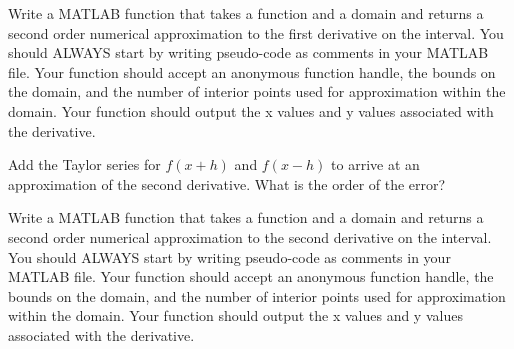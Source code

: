 
\begin{problem}
    Write a MATLAB function that takes a function and a domain and returns a second order
    numerical approximation to the first derivative on the interval. You should ALWAYS start by writing pseudo-code as comments in your
    MATLAB file.    Your function should
    accept an anonymous function handle, the bounds on the domain, and the number of
    interior points used for approximation within the domain. Your function should output
    the x values and y values associated with the derivative.\\
\end{problem}


\begin{problem}\label{prob:numdiff4}
    Add the Taylor series for $f(x+h)$ and $f(x-h)$ to arrive at an approximation of the
    second derivative. What is the order of the error?  
\end{problem}

\begin{problem}
    Write a MATLAB function that takes a function and a domain and returns a second order
    numerical approximation to the second derivative on the interval. You should ALWAYS start by writing pseudo-code as comments in your
    MATLAB file.    Your function should
    accept an anonymous function handle, the bounds on the domain, and the number of
    interior points used for approximation within the domain. Your function should output
    the x values and y values associated with the derivative.\\
\end{problem}


